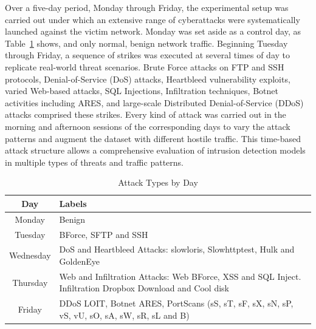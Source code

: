\documentclass[conference]{IEEEtran}
\begin{document}
Over a five-day period, Monday through Friday, the experimental setup was carried out under which an extensive range of cyberattacks were systematically launched against the victim network. Monday was set aside as a control day, as Table~\ref{tab:attack_days} shows, and only normal, benign network traffic. Beginning Tuesday through Friday, a sequence of strikes was executed at several times of day to replicate real-world threat scenarios. Brute Force attacks on FTP and SSH protocols, Denial-of-Service (DoS) attacks, Heartbleed vulnerability exploits, varied Web-based attacks, SQL Injections, Infiltration techniques, Botnet activities including ARES, and large-scale Distributed Denial-of-Service (DDoS) attacks comprised these strikes. Every kind of attack was carried out in the morning and afternoon sessions of the corresponding days to vary the attack patterns and augment the dataset with different hostile traffic. This time-based attack structure allows a comprehensive evaluation of intrusion detection models in multiple types of threats and traffic patterns.~\cite{13}


\begin{table}[htbp]
\caption{Attack Types by Day}
\label{tab:attack_days}
\centering
\begin{tabular}{|c|p{5.8cm}|}
\hline
\textbf{Day} & \textbf{Labels} \\
\hline
Monday & Benign \\
\hline
Tuesday & BForce, SFTP and SSH \\
\hline
Wednesday & DoS and Heartbleed Attacks: slowloris, Slowhttptest, Hulk and GoldenEye \\
\hline
Thursday & Web and Infiltration Attacks: Web BForce, XSS and SQL Inject. Infiltration Dropbox Download and Cool disk \\
\hline
Friday & DDoS LOIT, Botnet ARES, PortScans (sS, sT, sF, sX, sN, sP, vS, vU, sO, sA, sW, sR, sL and B) \\
\hline
\end{tabular}
\end{table}
\end{document}
